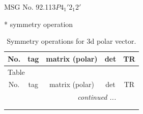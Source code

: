 \documentclass[fleqn,8pt]{jsarticle}
\begin{document}
\setcounter{MaxMatrixCols}{32}

\renewcommand{\tablename}{Table~}
\renewcommand{\figurename}{Figure~}
\begin{center}
\LARGE
MSG No. 92.113\quad$P4_{1}'2_{1}2'$
\end{center}
* symmetry operation
\renewcommand{\arraystretch}{1.3}
\begin{longtable}{ccccc}
\caption{Symmetry operations for 3d polar vector.}
 \\
 \hline \hline
No. & tag & matrix (polar) & det & TR \\ \hline \endfirsthead

\multicolumn{4}{l}{\tablename\ \thetable{}} \\
 \hline \hline
No. & tag & matrix (polar) & det & TR \\ \hline \endhead

 \hline \hline
\multicolumn{4}{r}{\footnotesize\it continued ...} \\ \endfoot

 \hline \hline
\multicolumn{4}{r}{} \\ \endlastfoot


\end{longtable}
\end{document}
